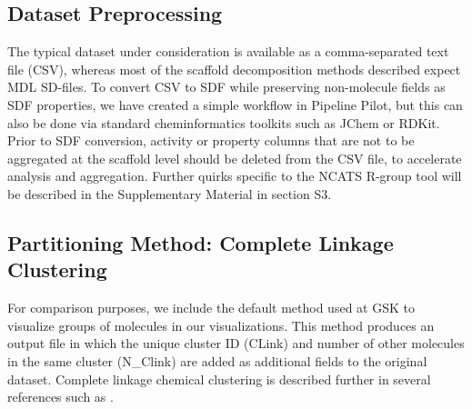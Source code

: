 \documentclass[journal=jacsat,biochem,manuscript=article]{achemso}
\begin{document}
\subsection{Dataset Preprocessing}
\label{sec:prepro}
The typical dataset under consideration is available as a
comma-separated text file (CSV), whereas most of the scaffold
decomposition methods described expect MDL SD-files. To convert CSV to
SDF while preserving non-molecule fields as SDF properties, we have
created a simple workflow in Pipeline Pilot\cite{PPilot}, but this can also be done
via standard cheminformatics toolkits such as JChem\cite{JChem} or RDKit\cite{RDKit}. Prior to
SDF conversion, activity or property columns that are not to be
aggregated at the scaffold level should be deleted from the CSV file,
to accelerate analysis and aggregation.  Further quirks specific to the NCATS R-group tool
will be described in the Supplementary Material in section S3.

\subsection{Partitioning Method: Complete Linkage Clustering}
For comparison purposes, we include the default method used at GSK to visualize groups of
molecules in our visualizations. This
method produces an output file in which the unique cluster ID (CLink)
and number of other molecules in the same cluster (N\_Clink) are added
as additional fields to the original dataset.  Complete linkage
chemical clustering is described further in several references such
as \citet{Jain2010,Downs2003}.
\end{document}
